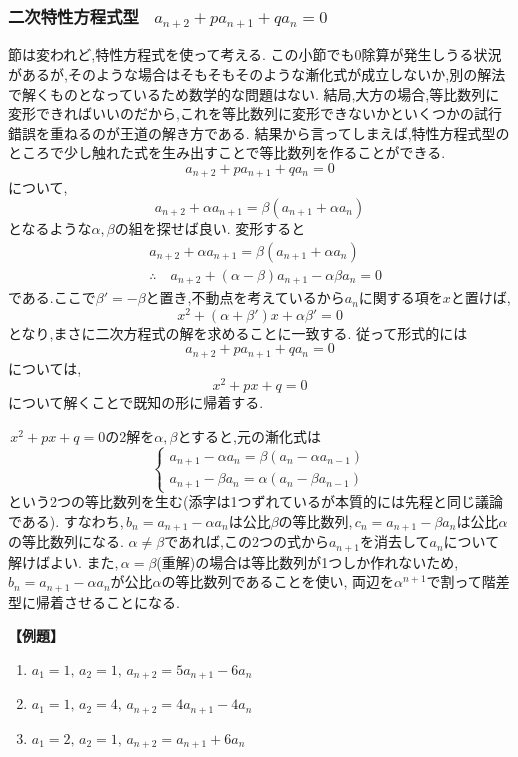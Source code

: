 
\subsubsection{二次特性方程式型 \, $\displaystyle a_{n+2}+pa_{n+1}+qa_n=0$}
節は変われど,特性方程式を使って考える.
この小節でも0除算が発生しうる状況があるが,そのような場合はそもそもそのような漸化式が成立しないか,別の解法で解くものとなっているため数学的な問題はない.
結局,大方の場合,等比数列に変形できればいいのだから,これを等比数列に変形できないかといくつかの試行錯誤を重ねるのが王道の解き方である.
結果から言ってしまえば,特性方程式型のところで少し触れた式を生み出すことで等比数列を作ることができる.
\[
  a_{n+2}+pa_{n+1}+qa_n=0
\]
について,
\[
  a_{n+2}+\alpha a_{n+1}=\beta(a_{n+1}+\alpha a_{n})
\]
となるような$\alpha,\beta$の組を探せば良い.
変形すると
\begin{align*}
   & a_{n+2}+\alpha a_{n+1}=\beta(a_{n+1}+\alpha a_{n})               \\
   & \therefore \quad a_{n+2}+(\alpha-\beta)a_{n+1}-\alpha\beta a_n=0
\end{align*}
である.ここで$\beta'=-\beta$と置き,不動点を考えているから$a_n$に関する項を$x$と置けば,
\[
  x^2+(\alpha+\beta')x+\alpha\beta'=0
\]
となり,まさに二次方程式の解を求めることに一致する.
従って形式的には
\[
  a_{n+2}+pa_{n+1}+qa_n=0
\]
については,
\[
  x^2+px+q=0
\]
について解くことで既知の形に帰着する.

\,$x^2+px+q=0$の2解を$\alpha,\beta$とすると,元の漸化式は
\[
  \begin{cases}
    a_{n+1}-\alpha a_n=\beta(a_n-\alpha a_{n-1}) \\
    a_{n+1}-\beta a_n=\alpha(a_n-\beta a_{n-1})
  \end{cases}
\]
という2つの等比数列を生む(添字は1つずれているが本質的には先程と同じ議論である).
すなわち,\,$b_n=a_{n+1}-\alpha a_n$は公比$\beta$の等比数列,\,$c_n=a_{n+1}-\beta a_n$は公比$\alpha$の等比数列になる.
$\alpha\ne\beta$であれば,この2つの式から$a_{n+1}$を消去して$a_n$について解けばよい.
また,\,$\alpha=\beta$(重解)の場合は等比数列が1つしか作れないため,\,$b_n=a_{n+1}-\alpha a_n$が公比$\alpha$の等比数列であることを使い,
両辺を$\alpha^{n+1}$で割って階差型に帰着させることになる.

\noindent \textbf{【例題】}
\begin{enumerate}[label=(\arabic*),parsep=3pt]
  \item $\displaystyle a_1=1,\,a_2=1,\, a_{n+2}=5a_{n+1}-6a_n$
  \item $\displaystyle a_1=1,\,a_2=4,\, a_{n+2}=4a_{n+1}-4a_n$
  \item $\displaystyle a_1=2,\,a_2=1,\, a_{n+2}=a_{n+1}+6a_n$
\end{enumerate}

